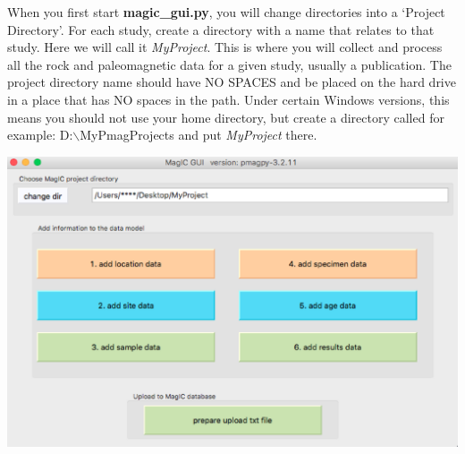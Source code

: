 \documentclass[11pt]{book}
\begin{document}
{When you first start {\bf magic\_gui.py}, you will change directories into a  `Project Directory'. For each study, create a directory with a name that relates to that study. Here we will call it {\it MyProject}.  This is where you will collect  and process all the rock and paleomagnetic data for a given study, usually a publication.   The project directory name should have NO SPACES and be placed on the hard drive in a place that has NO spaces in the path. Under certain Windows versions, this means you should not use your home directory, but create a directory called for example: D:$\backslash$MyPmagProjects and put {\it MyProject} there.

  \includegraphics[width=25cm]{EPSfiles/MM_main_frame.eps}

}
\end{document}
